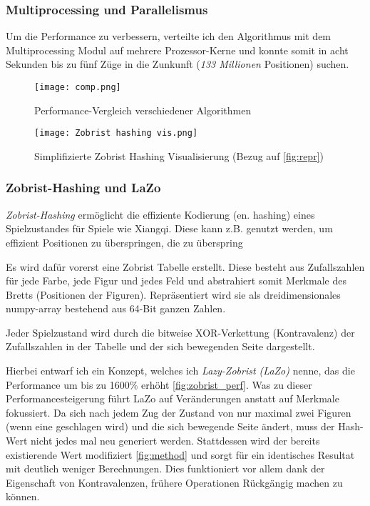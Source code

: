 \documentclass{jpp}
\begin{document}
\subsubsection{Multiprocessing und Parallelismus}
Um die Performance zu verbessern, verteilte ich den Algorithmus mit dem Multiprocessing Modul auf mehrere Prozessor-Kerne und konnte somit in acht Sekunden bis zu fünf Züge in die Zunkunft (\textit{133 Millionen} Positionen) suchen. 
\begin{figure}
  \centering
  \begin{minipage}{0.49\textwidth}
    \texttt{[image: comp.png]}
    \caption{Performance-Vergleich verschiedener Algorithmen}
    \label{fig:algcomp}
  \end{minipage}
  \hfill
  \begin{minipage}{0.4\textwidth}
    \texttt{[image: Zobrist hashing vis.png]}
    \caption{Simplifizierte Zobrist Hashing Visualisierung (Bezug auf \ref{fig:repr})}
    \label{fig:zobristvis}
  \end{minipage}
\end{figure}





\subsubsection{Zobrist-Hashing und LaZo}
\textit{Zobrist-Hashing} ermöglicht die effiziente Kodierung (en. hashing) eines Spielzustandes für Spiele wie Xiangqi. Diese kann z.B. genutzt werden, um effizient Positionen zu überspringen, die zu überspring

Es wird dafür vorerst eine Zobrist Tabelle erstellt. Diese besteht aus Zufallszahlen für jede Farbe, jede Figur und jedes Feld und abstrahiert somit Merkmale des Bretts (Positionen der Figuren). Repräsentiert wird sie als dreidimensionales numpy-array bestehend aus 64-Bit ganzen Zahlen. 

Jeder Spielzustand wird durch die bitweise XOR-Verkettung (Kontravalenz) der Zufallszahlen in der Tabelle und der sich bewegenden Seite dargestellt.

Hierbei entwarf ich ein Konzept, welches ich \textit{Lazy-Zobrist (LaZo) }nenne, das die Performance um bis zu 1600\% erhöht \ref{fig:zobrist_perf}. Was zu dieser Performancesteigerung führt LaZo auf Veränderungen anstatt auf Merkmale fokussiert. Da sich nach jedem Zug der Zustand von nur maximal zwei Figuren (wenn eine geschlagen wird) und die sich bewegende Seite ändert, muss der Hash-Wert nicht jedes mal neu generiert werden. Stattdessen wird der bereits existierende Wert modifiziert \ref{fig:method} und sorgt für ein identisches Resultat mit deutlich weniger Berechnungen. Dies funktioniert vor allem dank der Eigenschaft von Kontravalenzen, frühere Operationen Rückgängig machen zu können. 
\end{document}
